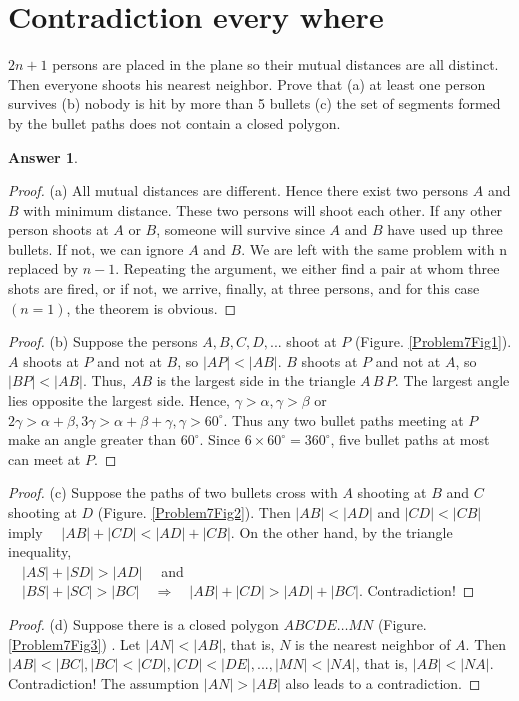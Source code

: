 \documentclass[a4paper]{article}
\renewcommand{\(}{\left(}
\renewcommand{\)}{\right)}
\theoremstyle{plain}
\theoremstyle{plain}
\theoremstyle{definition}
\newtheorem*{answer}{Answer}
\begin{document}
\section{Contradiction every where}
$2n + 1$ persons are placed in the plane so their mutual distances are all distinct. Then everyone
shoots his nearest neighbor. Prove that (a) at least one person survives (b) nobody is hit by more than
5 bullets (c) the set of segments formed by the bullet paths does not contain a closed polygon.
\begin{shaded}
\begin{answer}
$$  $$
\begin{proof}
(a) All mutual distances are different. Hence there exist two persons $A$ and $B$ with
minimum distance. These two persons will shoot each other. If any other person
shoots at $A$ or $B$, someone will survive since $A$ and $B$ have used up three bullets. If
not, we can ignore $A$ and $B$. We are left with the same problem with n replaced by
$n − 1$. Repeating the argument, we either find a pair at whom three shots are fired,
or if not, we arrive, finally, at three persons, and for this case $(n = 1)$, the theorem
is obvious.
\end{proof}
\begin{proof}
(b) Suppose the persons $A,B,C,D, . . . $ shoot at $P$ (Figure. \ref{Problem7Fig1}). $A$ shoots at $P$ and
not at $B$, so $|AP| < |AB|$. $B$ shoots at $P$ and not at $A$, so $|BP| < |AB|$. Thus, $AB$ is
the largest side in the triangle $A\,B\,P$. The largest angle lies opposite the largest side.
Hence, $\gamma > \alpha, \gamma > \beta$ or $2\gamma > \alpha + \beta, 3\gamma > \alpha + \beta + \gamma ,\gamma > 60^{\circ}$. Thus any two
bullet paths meeting at $P$ make an angle greater than $60^{\circ}$. Since $6 \times 60^{\circ}  = 360^{\circ}$,
five bullet paths at most can meet at $P$.

\end{proof}
\begin{proof}
(c) Suppose the paths of two bullets cross with $A$ shooting at $B$ and $C$ shooting
at $D$ (Figure. \ref{Problem7Fig2}). Then $|AB| < |AD|$ and $|CD| < |CB|\quad $ imply $\quad |AB| + |CD| <
|AD| + |CB|$. On the other hand, by the triangle inequality, \\  $ \quad |AS| + |SD| > |AD| \quad $
and $ \quad |BS| + |SC| > |BC| \quad \Rightarrow \quad |AB| + |CD| > |AD| + |BC|$. Contradiction!
\end{proof}
\begin{proof}
  (d) Suppose there is a closed polygon $ABCDE \dots  MN$  (Figure. \ref{Problem7Fig3}) . Let $|AN| <
|AB|$, that is, $N$ is the nearest neighbor of $A$. Then $|AB| < |BC|, |BC| < |CD|,
|CD| < |DE|, . . ., |MN| < |NA|$, that is, $|AB| < |NA|$. Contradiction! The
assumption $|AN| > |AB|$ also leads to a contradiction.
\end{proof}
\end{answer}
\end{shaded}
\end{document}
